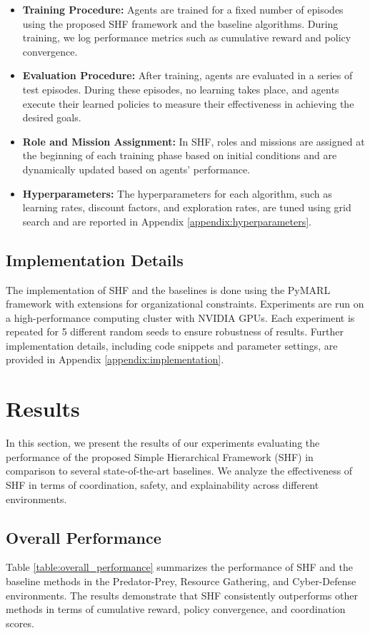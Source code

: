 \documentclass[sigconf,anonymous]{aamas}
\begin{document}
\begin{itemize}
    \item \textbf{Training Procedure:} Agents are trained for a fixed number of episodes using the proposed SHF framework and the baseline algorithms. During training, we log performance metrics such as cumulative reward and policy convergence.
    \item \textbf{Evaluation Procedure:} After training, agents are evaluated in a series of test episodes. During these episodes, no learning takes place, and agents execute their learned policies to measure their effectiveness in achieving the desired goals.
    \item \textbf{Role and Mission Assignment:} In SHF, roles and missions are assigned at the beginning of each training phase based on initial conditions and are dynamically updated based on agents' performance.
    \item \textbf{Hyperparameters:} The hyperparameters for each algorithm, such as learning rates, discount factors, and exploration rates, are tuned using grid search and are reported in Appendix \ref{appendix:hyperparameters}.
\end{itemize}

\subsection{Implementation Details}
The implementation of SHF and the baselines is done using the PyMARL framework \cite{pymarl_reference} with extensions for organizational constraints. Experiments are run on a high-performance computing cluster with NVIDIA GPUs. Each experiment is repeated for 5 different random seeds to ensure robustness of results. Further implementation details, including code snippets and parameter settings, are provided in Appendix \ref{appendix:implementation}.

\section{Results}
In this section, we present the results of our experiments evaluating the performance of the proposed Simple Hierarchical Framework (SHF) in comparison to several state-of-the-art baselines. We analyze the effectiveness of SHF in terms of coordination, safety, and explainability across different environments.

\subsection{Overall Performance}
Table \ref{table:overall_performance} summarizes the performance of SHF and the baseline methods in the Predator-Prey, Resource Gathering, and Cyber-Defense environments. The results demonstrate that SHF consistently outperforms other methods in terms of cumulative reward, policy convergence, and coordination scores.
\end{document}
